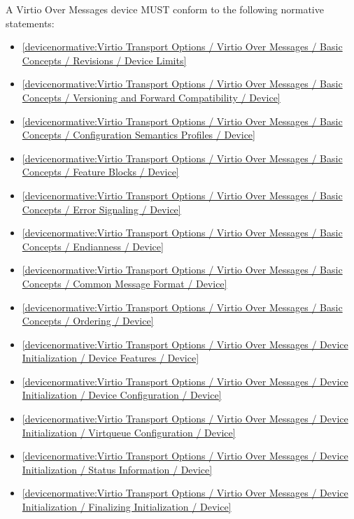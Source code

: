 \label{sec:Conformance / Device Conformance / Virtio Over Messages Device Conformance}

A Virtio Over Messages device MUST conform to the following normative statements:

\begin{itemize}
\item \ref{devicenormative:Virtio Transport Options / Virtio Over Messages / Basic Concepts / Revisions / Device Limits}
\item \ref{devicenormative:Virtio Transport Options / Virtio Over Messages / Basic Concepts / Versioning and Forward Compatibility / Device}
\item \ref{devicenormative:Virtio Transport Options / Virtio Over Messages / Basic Concepts / Configuration Semantics Profiles / Device}
\item \ref{devicenormative:Virtio Transport Options / Virtio Over Messages / Basic Concepts / Feature Blocks / Device}
\item \ref{devicenormative:Virtio Transport Options / Virtio Over Messages / Basic Concepts / Error Signaling / Device}
\item \ref{devicenormative:Virtio Transport Options / Virtio Over Messages / Basic Concepts / Endianness / Device}
\item \ref{devicenormative:Virtio Transport Options / Virtio Over Messages / Basic Concepts / Common Message Format / Device}
\item \ref{devicenormative:Virtio Transport Options / Virtio Over Messages / Basic Concepts / Ordering / Device}
\item \ref{devicenormative:Virtio Transport Options / Virtio Over Messages / Device Initialization / Device Features / Device}
\item \ref{devicenormative:Virtio Transport Options / Virtio Over Messages / Device Initialization / Device Configuration / Device}
\item \ref{devicenormative:Virtio Transport Options / Virtio Over Messages / Device Initialization / Virtqueue Configuration / Device}
\item \ref{devicenormative:Virtio Transport Options / Virtio Over Messages / Device Initialization / Status Information / Device}
\item \ref{devicenormative:Virtio Transport Options / Virtio Over Messages / Device Initialization / Finalizing Initialization / Device}

\end{itemize}
